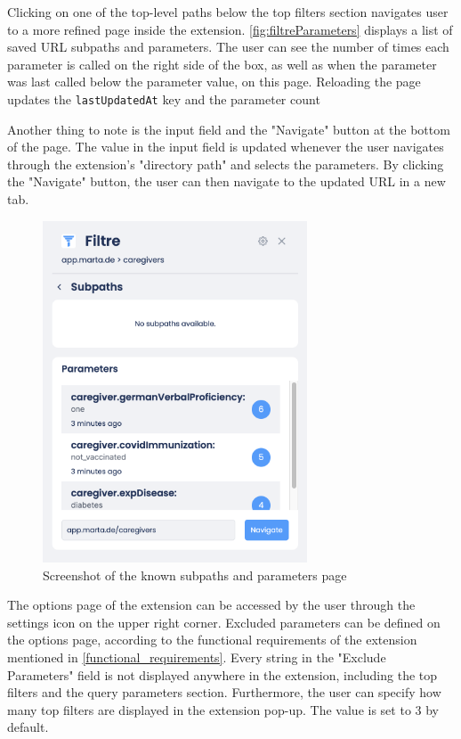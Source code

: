 Clicking on one of the top-level paths below the top filters section navigates user to a more refined page inside the extension. \autoref{fig:filtreParameters} displays a list of saved URL subpaths and parameters. The user can see the number of times each parameter is called on the right side of the box, as well as when the parameter was last called below the parameter value, on this page. Reloading the page updates the \texttt{lastUpdatedAt} key and the parameter count

Another thing to note is the input field and the "Navigate" button at the bottom of the page. The value in the input field is updated whenever the user navigates through the extension's "directory path" and selects the parameters. By clicking the "Navigate" button, the user can then navigate to the updated URL in a new tab.

\begin{figure}[H]
  \centering
  \includegraphics[width=0.7\textwidth]{assets/screenshot_filtre_parameters.png}
  \caption{Screenshot of the known subpaths and parameters page}
  \label{fig:filtreParameters}
\end{figure}

The options page of the extension can be accessed by the user through the settings icon on the upper right corner. Excluded parameters can be defined on the options page, according to the functional requirements of the extension mentioned in \autoref{functional_requirements}. Every string in the "Exclude Parameters" field is not displayed anywhere in the extension, including the top filters and the query parameters section. Furthermore, the user can specify how many top filters are displayed in the extension pop-up. The value is set to 3 by default.

